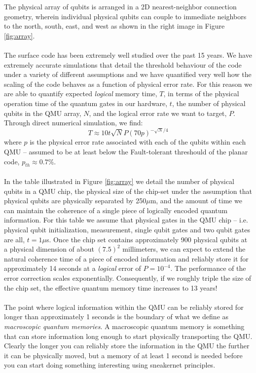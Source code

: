 \documentclass[aps,prl,twocolumn,10pt,nofootinbib]{revtex4}
\begin{document}
The physical array of qubits is arranged in a 2D nearest-neighbor connection geometry, wherein individual physical qubits can couple to immediate neighbors to the north, south, east, and west as shown in the right image in Figure \ref{fig:array}. 
\\
\\
The surface code has been extremely well studied over the past 15 years.  We have extremely accurate simulations that detail the threshold behaviour of the code under a variety of different assumptions and we have quantified very well how the scaling of the code behaves as a function of physical error rate.  For this reason we are able to quantify expected {\em logical} memory time, $T$, in terms of the physical operation time of the quantum gates in our hardware, $t$, the number of physical qubits in the QMU array, $N$, and the logical error rate we want to target, $P$.  Through direct numerical simulation, we find:
\begin{equation}
T \approx 10t\sqrt{N} P(70p)^{-\sqrt{N}/4}
\label{eq:scale}
\end{equation}
where $p$ is the physical error rate associated with each of the qubits within each QMU -- assumed to be at least below the Fault-tolerant threshould of the planar code, $p_{th} \approx 0.7\%$.
\\
\\
In the table illustrated in Figure \ref{fig:array} we detail the number of physical qubits in a QMU chip, the physical size of the chip-set under the assumption that physical qubits are physically separated by 250$\mu$m, and the amount of time we can maintain the coherence of a single piece of logically encoded quantum information. For this table we assume that physical gates in the QMU chip -- i.e. physical qubit initialization, measurement, single qubit gates and two qubit gates are all, $t = 1\mu$s.  Once the chip set contains approximately 900 physical qubits at a physical dimension of about $(7.5)^2$ millimeters, we can expect to extend the natural coherence time of a piece of encoded information and reliably store it for approximately 14 seconds at a {\em logical} error of $P= 10^{-4}$.   The performance of the error correction scales exponentially.  Consequently, if we roughly triple the size of the chip set, the effective quantum memory time increases to 13 years!
\\
\\
The point where logical information within the QMU can be reliably stored for longer than approximately 1 seconds is the boundary of what we define as {\em macroscopic quantum memories}.  A macroscopic quantum memory is something that can store information long enough to start physically transporting the QMU.  Clearly the longer you can reliably store the information in the QMU the further it can be physically moved, but a memory of at least 1 second is needed before you can start doing something interesting using sneakernet principles.
\end{document}

